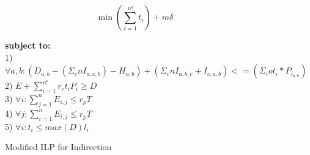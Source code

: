 \begin{figure}[t]
\small
\centering
\begin{mdframed}
\[
\min \left(\sum_{i=1}^{n!} t_i\right) + m\delta
\]
\begin{tabbing}
\textbf{subject to:}\\[4pt]
1)  $\forall a, b: (D_{a,b} - (\Sigma_{c}{n} I_{a,c,b}) - H_{a,b})
    + (\Sigma_{c}{n} I_{a,b,c} + I_{c,a,b})
    <= (\Sigma_{i}{o} t_i * P_{i_{a,b}})$ \\[4pt]
2) $E + \sum_{i=1}^{n!} r_c t_i P_i \geq D$\\[4pt]
3) $\forall i: \sum_{j=1}^{n} E_{i,j} \leq r_p T$\\[4pt]
4) $\forall j: \sum_{i=1}^{n} E_{i,j} \leq r_p T$\\[4pt]
5) $\forall i: t_i \leq \textit{max}(D) l_i$
\end{tabbing}
\end{mdframed}
\caption{Modified ILP for Indirection}
\label{fig:hybrid-indirection}
\end{figure}


